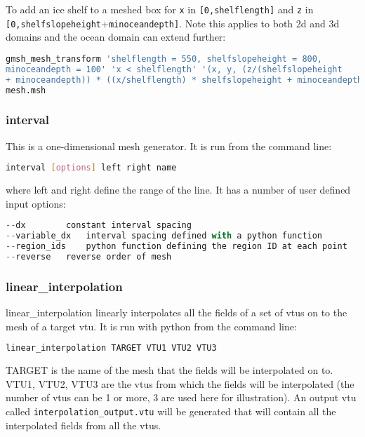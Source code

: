 To add an ice shelf to a meshed box for \lstinline[language = Bash]+x+ in \lstinline[language = Bash]+[0,shelflength]+ and \lstinline[language = Bash]+z+ in \lstinline[language = Bash]+[0,shelfslopeheight++\lstinline[language = Bash]+minoceandepth]+. Note this applies to both 2d and 3d domains and the ocean domain can extend further:
\begin{lstlisting}[language = Bash]
gmsh_mesh_transform 'shelflength = 550, shelfslopeheight = 800, 
minoceandepth = 100' 'x < shelflength' '(x, y, (z/(shelfslopeheight 
+ minoceandepth)) * ((x/shelflength) * shelfslopeheight + minoceandepth))' 
mesh.msh
\end{lstlisting}


\subsubsection{interval}
\label{sec:interval}

This is a one-dimensional mesh generator. It is run from the command line:
\begin{lstlisting}[language = Bash]
interval [options] left right name 
\end{lstlisting}
where left and right define the range of the line. It has a number of user defined input options:

\begin{lstlisting}[language = Python]
--dx		constant interval spacing
--variable_dx	interval spacing defined with a python function
--region_ids	python function defining the region ID at each point
--reverse	reverse order of mesh
\end{lstlisting}


\subsubsection{linear\_interpolation}
\label{sec:scripts_linear_interpolation}
linear\_interpolation linearly interpolates all the fields of a set of vtus on to the mesh of a target vtu. It is run with python from the command line:
\begin{lstlisting}[language = Bash]
linear_interpolation TARGET VTU1 VTU2 VTU3 
\end{lstlisting}
TARGET is the name of the mesh that the fields will be interpolated on to. VTU1, VTU2, VTU3 are the vtus from which the fields will be interpolated (the number of vtus can be 1 or more, 3 are used here for illustration). An output vtu called \lstinline[language = Bash]+interpolation_output.vtu+ will be generated that will contain all the interpolated fields from all the vtus. 

